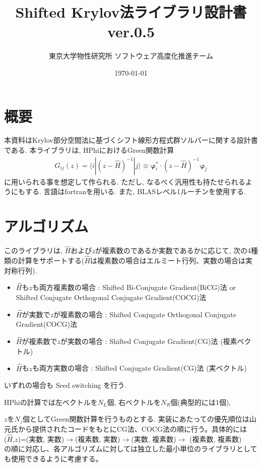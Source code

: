 \documentclass[12pt,titlepage]{jarticle}
\begin{document}
%
%
\title{Shifted Krylov法ライブラリ設計書 ver.0.5}
\author{東京大学物性研究所 ソフトウェア高度化推進チーム}
\date{\today}
\maketitle
%

%
%
\tableofcontents

\section{概要}

本資料はKrylov部分空間法に基づくシフト線形方程式群ソルバーに関する設計書である.
本ライブラリは, HPhiにおけるGreen関数計算
\begin{align}
  G_{i j}(z) = \langle i | (z-{\hat H})^{-1}| j \rangle \equiv 
  {\boldsymbol \varphi}_i^{*} \cdot (z-{\hat H})^{-1} {\boldsymbol \varphi}_j
\end{align}
に用いられる事を想定して作られる.
ただし, なるべく汎用性も持たせられるようにもする.
言語はfortranを用いる. 
また, BLASレベル1ルーチンを使用する.

\section{アルゴリズム}

このライブラリは, ${\hat H}$および$z$が複素数のであるか実数であるかに応じて,
次の4種類の計算をサポートする(${\hat H}$は複素数の場合はエルミート行列、実数の場合は実対称行列).

\begin{itemize}
\item ${\hat H}$も$z$も両方複素数の場合 : Shifted Bi-Conjugate Gradient(BiCG)法 \cite{BiCG} or Shifted Conjugate Orthogonal Conjugate Gradient(COCG)法 \cite{COCG}
\item ${\hat H}$が実数で$z$が複素数の場合 : Shifted Conjugate Orthogonal Conjugate Gradient(COCG)法 \cite{COCG}
\item ${\hat H}$が複素数で$z$が実数の場合 : Shifted Conjugate Gradient(CG)法 (複素ベクトル)
\item ${\hat H}$も$z$も両方実数の場合 : Shifted Conjugate Gradient(CG)法 (実ベクトル)
\end{itemize}
いずれの場合も Seed switching を行う.

HPhiの計算では左ベクトルを$N_L$個, 右ベクトルを$N_R$個(典型的には1個),

$z$を$N_z$個としてGreen関数計算を行うものとする.
実装にあたっての優先順位は山元氏から提供されたコードをもとにCG法、COCG法の順に行う。具体的には\\
(${\hat H}$,$z$)=(実数, 実数)$\to$(複素数, 実数)$\to$(実数, 複素数)$\to$ (複素数, 複素数)\\
の順に対応し、各アルゴリズムに対しては独立した最小単位のライブラリとしても使用できるように考慮する。
\end{document}
